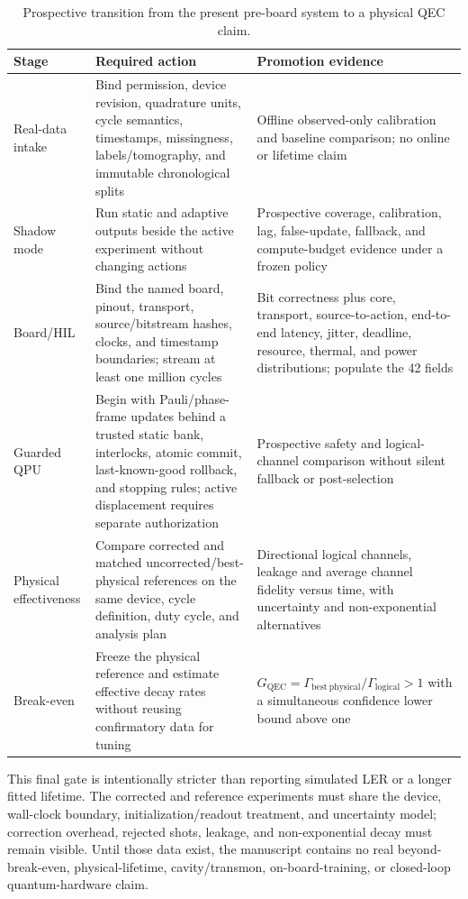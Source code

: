 \documentclass[11pt]{article}
\begin{document}
\begin{table}[htbp]
\centering
\small
\caption{Prospective transition from the present pre-board system to a physical
QEC claim.}
\label{tab:physical-transition}
\begin{tabularx}{\textwidth}{@{}L{0.13\textwidth} L{0.29\textwidth} Y@{}}
\toprule
Stage & Required action & Promotion evidence \\
\midrule
Real-data intake & Bind permission, device revision, quadrature units, cycle semantics, timestamps, missingness, labels/tomography, and immutable chronological splits & Offline observed-only calibration and baseline comparison; no online or lifetime claim \\
Shadow mode & Run static and adaptive outputs beside the active experiment without changing actions & Prospective coverage, calibration, lag, false-update, fallback, and compute-budget evidence under a frozen policy \\
Board/HIL & Bind the named board, pinout, transport, source/bitstream hashes, clocks, and timestamp boundaries; stream at least one million cycles & Bit correctness plus core, transport, source-to-action, end-to-end latency, jitter, deadline, resource, thermal, and power distributions; populate the 42 fields \\
Guarded QPU & Begin with Pauli/phase-frame updates behind a trusted static bank, interlocks, atomic commit, last-known-good rollback, and stopping rules; active displacement requires separate authorization & Prospective safety and logical-channel comparison without silent fallback or post-selection \\
Physical effectiveness & Compare corrected and matched uncorrected/best-physical references on the same device, cycle definition, duty cycle, and analysis plan & Directional logical channels, leakage and average channel fidelity versus time, with uncertainty and non-exponential alternatives \\
Break-even & Freeze the physical reference and estimate effective decay rates without reusing confirmatory data for tuning & $G_{\mathrm{QEC}}=\Gamma_{\mathrm{best\ physical}}/\Gamma_{\mathrm{logical}}>1$ with a simultaneous confidence lower bound above one \\
\bottomrule
\end{tabularx}
\end{table}

This final gate is intentionally stricter than reporting simulated LER or a
longer fitted lifetime.  The corrected and reference experiments must share the
device, wall-clock boundary, initialization/readout treatment, and uncertainty
model; correction overhead, rejected shots, leakage, and non-exponential decay
must remain visible.  Until those data exist, the manuscript contains no real
beyond-break-even, physical-lifetime, cavity/transmon, on-board-training, or
closed-loop quantum-hardware claim.
\end{document}
